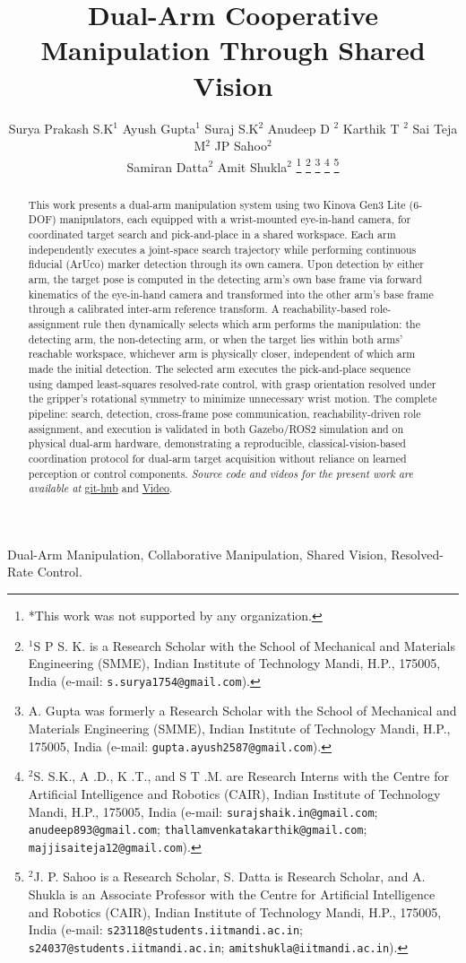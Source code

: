 \documentclass[letterpaper, 10 pt, conference]{ieeeconf}  %
\title{\LARGE \bf
Dual-Arm Cooperative Manipulation Through Shared Vision}
\author{Surya Prakash S.K$^{1}$ Ayush Gupta$^{1}$ Suraj S.K$^{2}$ Anudeep D $^{2}$ Karthik T $^{2}$ Sai Teja M$^{2}$ JP Sahoo$^{2}$ \\ Samiran Datta$^{2}$ Amit Shukla$^{2}$ %
\thanks{*This work was not supported by any organization.}%
\thanks{$^{1}$S P S. K. is a Research Scholar with the School of Mechanical and Materials Engineering (SMME), Indian Institute of Technology Mandi, H.P., 175005, India (e-mail: {\tt\small s.surya1754@gmail.com}).}%
\thanks{A. Gupta was formerly a Research Scholar with the School of Mechanical and Materials Engineering (SMME), Indian Institute of Technology Mandi, H.P., 175005, India (e-mail: {\tt\small gupta.ayush2587@gmail.com}).}%
\thanks{$^{2}$S. S.K., A .D., K .T., and S T .M. are Research Interns with the Centre for Artificial Intelligence and Robotics (CAIR), Indian Institute of Technology Mandi, H.P., 175005, India (e-mail: {\tt\small surajshaik.in@gmail.com}; {\tt\small anudeep893@gmail.com}; {\tt\small thallamvenkatakarthik@gmail.com}; {\tt\small majjisaiteja12@gmail.com}).}%
\thanks{$^{2}$J. P. Sahoo is a Research Scholar, S. Datta is Research Scholar, and A. Shukla is an Associate Professor with the Centre for Artificial Intelligence and Robotics (CAIR), Indian Institute of Technology Mandi, H.P., 175005, India (e-mail: {\tt\small s23118@students.iitmandi.ac.in}; {\tt\small s24037@students.iitmandi.ac.in}; {\tt\small amitshukla@iitmandi.ac.in}).}}%
\begin{document}
\maketitle
\thispagestyle{empty}
\pagestyle{empty}


\begin{abstract}
This work presents a dual-arm manipulation system using two Kinova Gen3 Lite (6-DOF) manipulators, each equipped with a wrist-mounted eye-in-hand camera, for coordinated target search and pick-and-place in a shared workspace. Each arm independently executes a joint-space search trajectory while performing continuous fiducial (ArUco) marker detection through its own camera. Upon detection by either arm, the target pose is computed in the detecting arm's own base frame via forward kinematics of the eye-in-hand camera and transformed into the other arm's base frame through a calibrated inter-arm reference transform. A reachability-based role-assignment rule then dynamically selects which arm performs the manipulation: the detecting arm, the non-detecting arm, or when the target lies within both arms' reachable workspace, whichever arm is physically closer, independent of which arm made the initial detection. The selected arm executes the pick-and-place sequence using damped least-squares resolved-rate control, with grasp orientation resolved under the gripper's rotational symmetry to minimize unnecessary wrist motion. The complete pipeline: search, detection, cross-frame pose communication, reachability-driven role assignment, and execution is validated in both Gazebo/ROS2 simulation and on physical dual-arm hardware, demonstrating a reproducible, classical-vision-based coordination protocol for dual-arm target acquisition without reliance on learned perception or control components. \textit{Source code and videos for the present work are available at} \href{https://github.com/suryaroboticarm/Shared-Vision-for-Dual-Arm.git}{git-hub} and \href{https://drive.google.com/drive/folders/114Fpy-4yFBnGds0StAoZXTxJKZZoLpme?usp=sharing}{Video}.
\end{abstract}
\begin{keywords}
    Dual-Arm Manipulation, Collaborative Manipulation, Shared Vision, Resolved-Rate Control.
\end{keywords}

\end{document}
